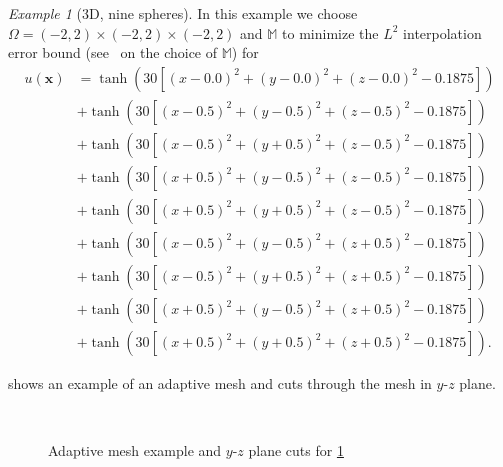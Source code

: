 \documentclass[american]{scrartcl}
\providecommand{\V}[1]{\boldsymbol{#1}}
\providecommand{\M}{\mathbb{M}}
\theoremstyle{remark}
\newtheorem{example}{\hspace{1ex}Example}[section]
\begin{document}
\newpage
\begin{example}[3D, nine spheres]
\label{ex:nine:spheres}
In this example we choose $\Omega = (-2,2) \times (-2,2) \times (-2,2)$ and $\M$ to minimize the $L^2$ interpolation error bound (see~\cite{Hua02b} on the choice of $\M$) for
\begin{align*}
   u(\V{x}) &=
      \tanh\left(30\left[{(x-0.0)}^2 + {(y-0.0)}^2 + {(z-0.0)}^2 - 0.1875\right]\right)\\
   &+ \tanh\left(30\left[{(x-0.5)}^2 + {(y-0.5)}^2 + {(z-0.5)}^2 - 0.1875\right]\right)\\
   &+ \tanh\left(30\left[{(x-0.5)}^2 + {(y+0.5)}^2 + {(z-0.5)}^2 - 0.1875\right]\right)\\
   &+ \tanh\left(30\left[{(x+0.5)}^2 + {(y-0.5)}^2 + {(z-0.5)}^2 - 0.1875\right]\right)\\
   &+ \tanh\left(30\left[{(x+0.5)}^2 + {(y+0.5)}^2 + {(z-0.5)}^2 - 0.1875\right]\right)\\
   &+ \tanh\left(30\left[{(x-0.5)}^2 + {(y-0.5)}^2 + {(z+0.5)}^2 - 0.1875\right]\right)\\
   &+ \tanh\left(30\left[{(x-0.5)}^2 + {(y+0.5)}^2 + {(z+0.5)}^2 - 0.1875\right]\right)\\
   &+ \tanh\left(30\left[{(x+0.5)}^2 + {(y-0.5)}^2 + {(z+0.5)}^2 - 0.1875\right]\right)\\
   &+ \tanh\left(30\left[{(x+0.5)}^2 + {(y+0.5)}^2 + {(z+0.5)}^2 - 0.1875\right]\right)
   .
   
\end{align*}

 shows an example of an adaptive mesh and cuts through the mesh in $y$-$z$ plane.

\begin{figure}[t]
   \begin{subfigure}[t]{0.37\linewidth}
      
   \end{subfigure}   \qquad\qquad   \begin{subfigure}[t]{0.37\linewidth}
      
   \end{subfigure}   \\[1ex]
   \begin{subfigure}[t]{0.31\linewidth}
      
   \end{subfigure}   \hfill   \begin{subfigure}[t]{0.31\linewidth}
      
   \end{subfigure}   \hfill   \begin{subfigure}[t]{0.31\linewidth}
      
   \end{subfigure}
   \caption{Adaptive mesh example and $y$-$z$ plane cuts for \cref{ex:nine:spheres}\label{fig:nine:spheres}}
\end{figure}
\end{example}
\end{document}
